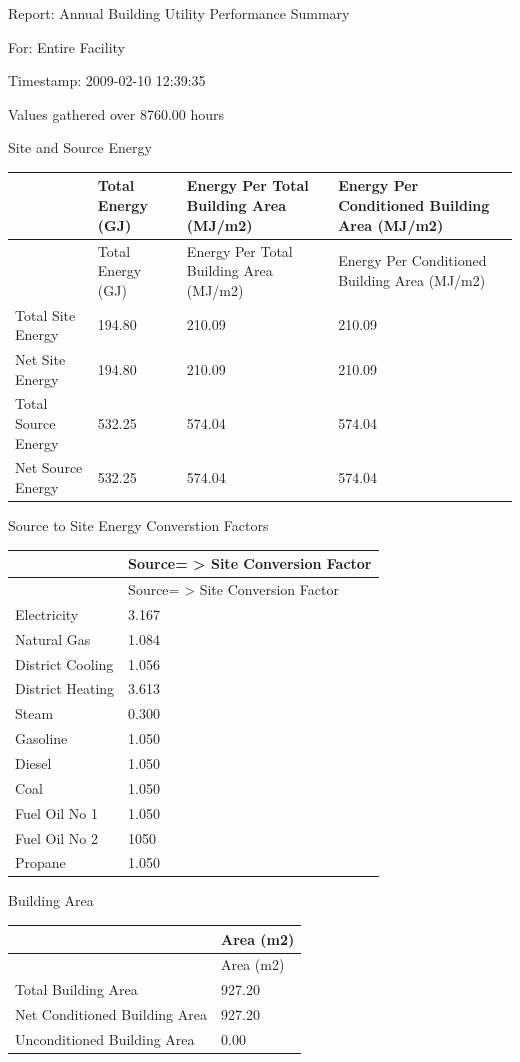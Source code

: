 Report: Annual Building Utility Performance Summary

For: Entire Facility

Timestamp: 2009-02-10 12:39:35

Values gathered over 8760.00 hours

Site and Source Energy

\begin{longtable}[c]{>{\raggedright}p{1.5in}>{\raggedright}p{1.5in}>{\raggedright}p{1.5in}>{\raggedright}p{1.5in}}
\toprule
~ & Total Energy (GJ) & Energy Per Total Building Area (MJ/m2) & Energy Per Conditioned Building Area (MJ/m2) \tabularnewline
\midrule
\endfirsthead

\toprule
~ & Total Energy (GJ) & Energy Per Total Building Area (MJ/m2) & Energy Per Conditioned Building Area (MJ/m2) \tabularnewline
\midrule
\endhead

Total Site Energy & 194.80 & 210.09 & 210.09 \tabularnewline
Net Site Energy & 194.80 & 210.09 & 210.09 \tabularnewline
Total Source Energy & 532.25 & 574.04 & 574.04 \tabularnewline
Net Source Energy & 532.25 & 574.04 & 574.04 \tabularnewline
\bottomrule
\end{longtable}

Source to Site Energy Converstion Factors

\begin{longtable}[c]{@{}ll@{}}
\toprule
~ & Source= > Site Conversion Factor \tabularnewline
\midrule
\endfirsthead

\toprule
~ & Source= > Site Conversion Factor \tabularnewline
\midrule
\endhead

Electricity & 3.167 \tabularnewline
Natural Gas & 1.084 \tabularnewline
District Cooling & 1.056 \tabularnewline
District Heating & 3.613 \tabularnewline
Steam & 0.300 \tabularnewline
Gasoline & 1.050 \tabularnewline
Diesel & 1.050 \tabularnewline
Coal & 1.050 \tabularnewline
Fuel Oil No 1 & 1.050 \tabularnewline
Fuel Oil No 2 & 1050 \tabularnewline
Propane & 1.050 \tabularnewline
\bottomrule
\end{longtable}

Building Area

\begin{longtable}[c]{@{}ll@{}}
\toprule
~ & Area (m2) \tabularnewline
\midrule
\endfirsthead

\toprule
~ & Area (m2) \tabularnewline
\midrule
\endhead

Total Building Area & 927.20 \tabularnewline
Net Conditioned Building Area & 927.20 \tabularnewline
Unconditioned Building Area & 0.00 \tabularnewline
\bottomrule
\end{longtable}

